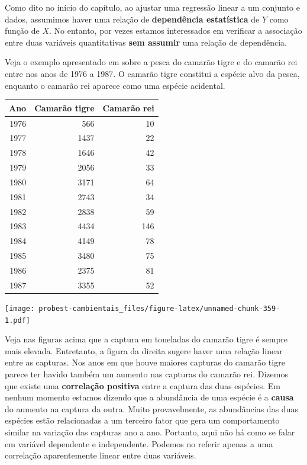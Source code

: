 \documentclass[
]{book}
\begin{document}
Como dito no início do capítulo, ao ajustar uma regressão linear a um conjunto e dados, assumimos haver uma relação de \textbf{dependência estatística} de \(Y\) como função de \(X\). No entanto, por vezes estamos interessados em verificar a associação entre duas variáveis quantitativas \textbf{sem assumir} uma relação de dependência.

Veja o exemplo apresentado em \citep{haddon2010modelling} sobre a pesca do camarão tigre e do camarão rei entre nos anos de 1976 a 1987. O camarão tigre constitui a espécie alvo da pesca, enquanto o camarão rei aparece como uma espécie acidental.

\begin{tabular}{r|r|r}
\hline
Ano & Camarão tigre & Camarão rei\\
\hline
1976 & 566 & 10\\
\hline
1977 & 1437 & 22\\
\hline
1978 & 1646 & 42\\
\hline
1979 & 2056 & 33\\
\hline
1980 & 3171 & 64\\
\hline
1981 & 2743 & 34\\
\hline
1982 & 2838 & 59\\
\hline
1983 & 4434 & 146\\
\hline
1984 & 4149 & 78\\
\hline
1985 & 3480 & 75\\
\hline
1986 & 2375 & 81\\
\hline
1987 & 3355 & 52\\
\hline
\end{tabular}

\texttt{[image: probest-cambientais\_files/figure-latex/unnamed-chunk-359-1.pdf]}

Veja nas figuras acima que a captura em toneladas do camarão tigre é sempre mais elevada. Entretanto, a figura da direita sugere haver uma relação linear entre as capturas. Nos anos em que houve maiores capturas do camarão tigre parece ter havido também um aumento nas capturas do camarão rei. Dizemos que existe uma \textbf{correlação positiva} entre a captura das duas espécies. Em nenhum momento estamos dizendo que a abundância de uma espécie é a \textbf{causa} do aumento na captura da outra. Muito provavelmente, as abundâncias das duas espécies estão relacionadas a um terceiro fator que gera um comportamento similar na variação das capturas ano a ano. Portanto, aqui não há como se falar em variável dependente e independente. Podemos no referir apenas a uma correlação aparentemente linear entre duas variáveis.
\end{document}
